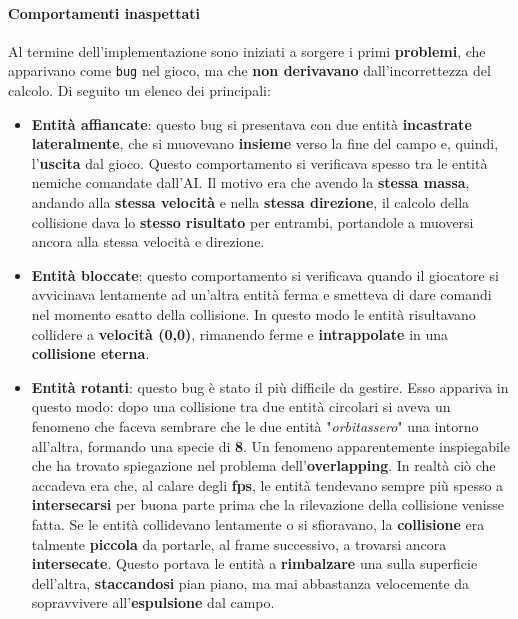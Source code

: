 \paragraph{Comportamenti inaspettati} Al termine dell'implementazione sono iniziati a sorgere i primi \textbf{problemi}, che apparivano come \texttt{bug} nel gioco, ma che \textbf{non derivavano} dall'incorrettezza del calcolo.
Di seguito un elenco dei principali:
\begin{itemize}
    \item \textbf{Entità affiancate}: questo bug si presentava con due entità \textbf{incastrate lateralmente}, che si muovevano \textbf{insieme} verso la fine del campo e, quindi, l'\textbf{uscita} dal gioco. Questo comportamento si verificava spesso tra le entità nemiche comandate dall'AI. Il motivo era che avendo la \textbf{stessa massa}, andando alla \textbf{stessa velocità} e nella \textbf{stessa direzione}, il calcolo della collisione dava lo \textbf{stesso risultato} per entrambi, portandole a muoversi ancora alla stessa velocità e direzione. 
    \item \textbf{Entità bloccate}: questo comportamento si verificava quando il giocatore si avvicinava lentamente ad un'altra entità ferma e smetteva di dare comandi nel momento esatto della collisione. In questo modo le entità risultavano collidere a \textbf{velocità (0,0)}, rimanendo ferme e \textbf{intrappolate} in una \textbf{collisione eterna}.
    \item \textbf{Entità rotanti}: questo bug è stato il più difficile da gestire. Esso appariva in questo modo: dopo una collisione tra due entità circolari si aveva un fenomeno che faceva sembrare che le due entità "\textit{orbitassero}" una intorno all'altra, formando una specie di \textbf{8}. Un fenomeno apparentemente inspiegabile che ha trovato spiegazione nel problema dell'\textbf{overlapping}. In realtà ciò che accadeva era che, al calare degli \textbf{fps}, le entità tendevano sempre più spesso a \textbf{intersecarsi} per buona parte prima che la rilevazione della collisione venisse fatta. Se le entità collidevano lentamente o si sfioravano, la \textbf{collisione} era talmente \textbf{piccola} da portarle, al frame successivo, a trovarsi ancora \textbf{intersecate}. Questo portava le entità a \textbf{rimbalzare} una sulla superficie dell'altra, \textbf{staccandosi} pian piano, ma mai abbastanza velocemente da sopravvivere all'\textbf{espulsione} dal campo.  
\end{itemize}

